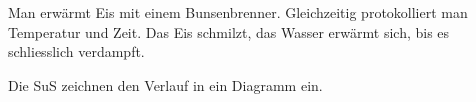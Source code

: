 Man erwärmt Eis mit einem Bunsenbrenner. Gleichzeitig protokolliert man Temperatur und Zeit.
Das Eis schmilzt, das Wasser erwärmt sich, bis es schliesslich verdampft.

Die SuS zeichnen den Verlauf in ein Diagramm ein.


